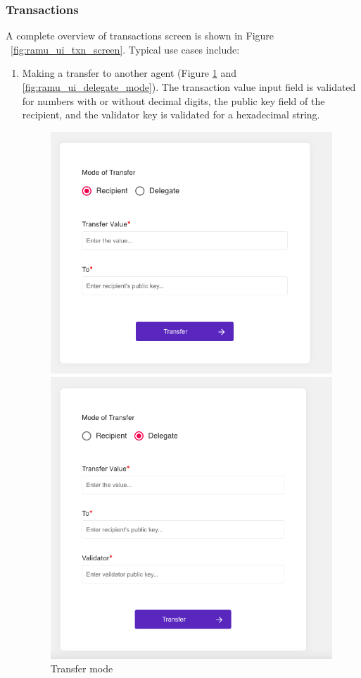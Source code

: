 \subsubsection{Transactions}
A complete overview of transactions screen is shown in Figure ~\ref{fig:ramu_ui_txn_screen}. Typical use cases include: 
\begin{enumerate}
	\item Making a transfer to another agent (Figure \ref{fig:ramu_ui_transfer_mode} and \ref{fig:ramu_ui_delegate_mode}). The transaction value input field is validated for numbers with or without decimal digits, the public key field of the recipient, and the validator key is validated for a hexadecimal string.
	\begin{figure}[!htb]
		  \includegraphics[width=\linewidth]{figures/images/ramu/t_transfer_recipient.png}
		  \caption{Transfer mode}
		\label{fig:ramu_ui_transfer_mode}
		\endminipage
		\hfill
		  \includegraphics[width=\linewidth]{figures/images/ramu/t_transfer_delegate.png}

\end{figure}
\end{enumerate}
